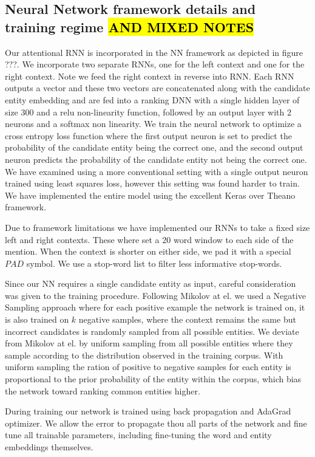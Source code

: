 \documentclass[11pt]{article}
\begin{document}
\subsection{Neural Network framework details and training regime \hl{AND MIXED NOTES}}
Our attentional RNN is incorporated in the NN framework as depicted in figure ???. We incorporate two separate RNNs, one for the left context and one for the right context. Note we feed the right context in reverse into RNN. Each RNN outputs a vector and these two vectors are concatenated along with the candidate entity embedding and are fed into a ranking DNN with a single hidden layer of size 300 and a relu non-linearity function, followed by an output layer with 2 neurons and a softmax non linearity. We train the neural network to optimize a cross entropy loss function where the first output neuron is set to predict the probability of the candidate entity being the correct one, and the second output neuron predicts the probability of the candidate entity not being the correct one. We have examined using a more conventional setting with a single output neuron trained using least squares loss, however this setting was found harder to train. We have implemented the entire model using the excellent Keras \cite{chollet2015} over Theano \cite{team2016theano} framework.

Due to framework limitations we have implemented our RNNs to take a fixed size left and right contexts. These where set a 20 word window to each side of the mention. When the context is shorter on either side, we pad it with a special $PAD$ symbol. We use a stop-word list to filter less informative stop-words.

Since our NN requires a single candidate entity as input, careful consideration was given to the training procedure. Following Mikolov at el. \cite{mikolov2013distributed} we used a Negative Sampling approach where for each positive example the network is trained on, it is also trained on $k$ negative samples, where the context remains the same but incorrect candidates is randomly sampled from all possible entities. We deviate from Mikolov at el. by uniform sampling from all possible entities where they sample according to the distribution observed in the training corpus. With uniform sampling the ration of positive to negative samples for each entity is proportional to the prior probability of the entity within the corpus, which bias the network toward ranking common entities higher.

During training our network is trained using back propagation and AdaGrad optimizer\cite{duchi2011adaptive}. We allow the error to propagate thou all parts of the network and fine tune all trainable parameters, including fine-tuning the word and entity embeddings themselves.
\end{document}
